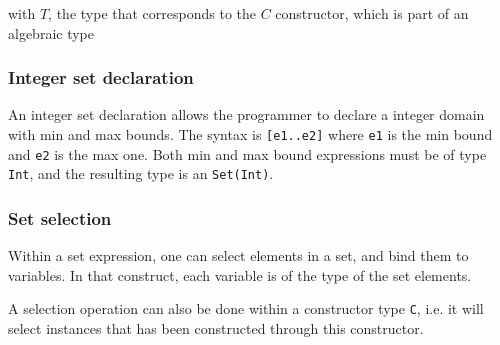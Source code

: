 \documentclass[11pt]{article}
\begin{document}
\begin{center}
 
\DP
\end{center}
\begin{center}with  $T$, the type that corresponds to the $C$ constructor, which is part of an algebraic type\end{center}

\subsubsection{Integer set declaration}

An integer set declaration allows the programmer to declare a integer domain with min and max bounds. The syntax is \texttt{[e1..e2]} where \texttt{e1} is the min bound and \texttt{e2} is the max one. Both min and max bound expressions must be of type \texttt{Int}, and the resulting type is an \texttt{Set(Int)}.

\begin{center}
 
\DP
\end{center}

\subsubsection{Set selection}

Within a set expression, one can select elements in a set, and bind them to variables. In that construct, each variable is of the type of the set elements.

\begin{center}
 
\DP
\end{center}

A selection operation can also be done within a constructor type \texttt{C}, i.e. it will select instances that has been constructed through this constructor.

\begin{center}
\DP
\end{center}
\end{document}

